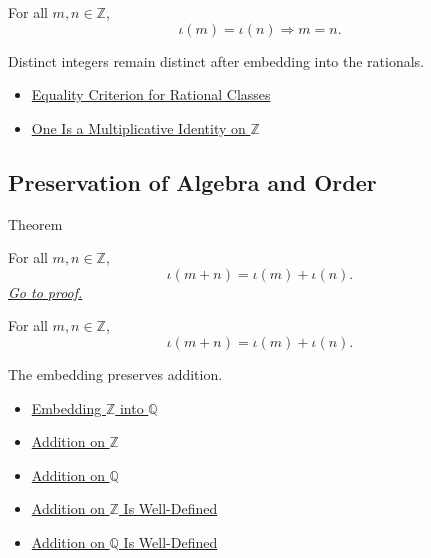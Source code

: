 \begin{remark*}
For all $m,n\in\mathbb{Z}$,
\[
\iota(m)=\iota(n)\Longrightarrow m=n.
\]
\end{remark*}

\begin{remark*}[Interpretation]
Distinct integers remain distinct after embedding into the rationals.
\end{remark*}

\begin{dependencies}
\begin{itemize}
  \item \hyperref[prop:equality-criterion-for-rational-classes]{Equality Criterion for Rational Classes}
  \item \hyperref[thm:one-multiplicative-identity-on-z]{One Is a Multiplicative Identity on $\mathbb{Z}$}
\end{itemize}
\end{dependencies}

\subsection*{Preservation of Algebra and Order}

\begin{theorembox}{Theorem}
\begin{theorem}
\label{thm:embedding-z-into-q-preserves-addition}
For all $m,n\in\mathbb{Z}$,
\[
\iota(m+n)=\iota(m)+\iota(n).
\]
\hyperref[prf:embedding-z-into-q-preserves-addition]{\textit{Go to proof.}}
\end{theorem}
\end{theorembox}

\begin{remark*}
For all $m,n\in\mathbb{Z}$,
\[
\iota(m+n)=\iota(m)+\iota(n).
\]
\end{remark*}

\begin{remark*}[Interpretation]
The embedding preserves addition.
\end{remark*}

\begin{dependencies}
\begin{itemize}
  
\item \hyperref[def:rational-chapter-embedding-z-into-q]{Embedding $\mathbb{Z}$ into $\mathbb{Q}$}
  \item \hyperref[def:addition-on-z-classes]{Addition on $\mathbb{Z}$}
  \item \hyperref[def:addition-on-q-classes]{Addition on $\mathbb{Q}$}
  \item \hyperref[thm:addition-on-z-well-defined]{Addition on $\mathbb{Z}$ Is Well-Defined}
  \item \hyperref[thm:addition-on-q-well-defined]{Addition on $\mathbb{Q}$ Is Well-Defined}
\end{itemize}
\end{dependencies}

